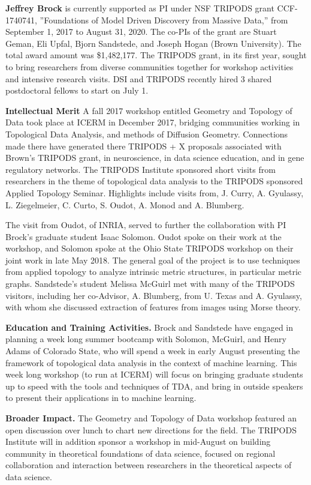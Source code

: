 

\textbf{Jeffrey Brock} is currently supported as PI under NSF TRIPODS grant CCF-1740741, ''Foundations of Model Driven Discovery from Massive Data,'' from September 1, 2017 to August 31, 2020. The co-PIs of the grant are Stuart Geman, Eli Upfal, Bjorn Sandstede, and Joseph Hogan (Brown University). The total award amount was \$1,482,177. The TRIPODS grant, in its first year, sought to bring researchers from diverse communities together for workshop activities and intensive research visits. DSI and TRIPODS recently hired 3 shared postdoctoral fellows to start on July 1.

\textbf{Intellectual Merit} A fall 2017 workshop entitled Geometry and Topology of Data took place at ICERM in December 2017, bridging communities working in Topological Data Analysis, and methods of Diffusion Geometry. Connections made there have generated there TRIPODS + X proposals associated with Brown's TRIPODS grant, in neuroscience, in data science education, and in gene regulatory networks. 
The TRIPODS Institute sponsored short visits from researchers in the theme of topological data analysis to the TRIPODS sponsored Applied Topology Seminar. Highlights include visits from, J. Curry, A. Gyulassy, L. Ziegelmeier, C. Curto, S. Oudot, A. Monod and A. Blumberg.

The visit from Oudot, of INRIA, served to further the collaboration with PI Brock's graduate student Isaac Solomon. Oudot spoke on their work at the workshop, and Solomon spoke at the Ohio State TRIPODS workshop on their joint work  \citep{Oudot:Solomon:persistence} in late May 2018. The general goal of the project is to use techniques from applied topology to analyze intrinsic metric structures, in particular metric graphs. Sandstede's student Melissa McGuirl met with many of the TRIPODS visitors, including her co-Advisor, A. Blumberg, from U. Texas and A. Gyulassy, with whom she discussed extraction of features from images using Morse theory. 

{\bf Education and Training Activities.}
Brock and Sandstede have engaged in planning a week long summer bootcamp with Solomon, McGuirl, and Henry Adams of Colorado State, who will spend a week in early August presenting the framework of topological data analysis in the context of machine learning. This week long workshop (to run at ICERM) will focus on bringing graduate students up to speed with the tools and techniques of TDA, and bring in outside speakers to present their applications in to machine learning.

{\bf Broader Impact.} The Geometry and Topology of Data workshop featured an open discussion over lunch to chart new directions for the field. The TRIPODS Institute will in addition sponsor a workshop in mid-August on building community in theoretical foundations of data science, focused on regional collaboration and interaction between researchers in the theoretical aspects of data science.
